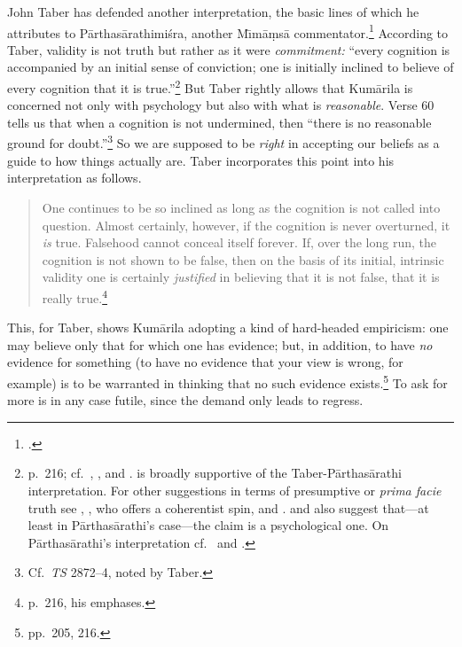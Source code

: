 \documentclass[11pt,letterpaper,oneside]{amsart}
\newenvironment{squote}{\begin{quote}\sf\small}{\rm\end{quote}} %
\begin{document}
John Taber has defended another interpretation, the basic lines of which he attributes to P\=arthas\=arathimi\'sra, another M\={\i}m\=a\d ms\=a commentator.\footnote{\citet{taber1992dkb}.} According to Taber, validity is not truth but rather as it were \emph{commitment:} ``every cognition is accompanied by an initial sense of conviction; one is initially inclined to believe of every cognition that it is true.''\footnote{p.\ 216; cf.\ \citet[p.\ 203]{taber1987review}, \citet[p.\ 172]{taber2002mo}, and \citet[p.\ 2]{taber2005hindu}. \cite{arnold2001ivr, arnold2001ivs} is broadly supportive of the Taber-P\=arthas\=arathi interpretation. For other suggestions in terms of presumptive or \emph{prima facie} truth see \citet[p.\ 18]{keith1921karma}, \citet[pp. 372--5]{dasgupta1957history}, who offers a coherentist spin, and \citet[pp.\ 131ff.]{bhatt1962epistemology}. \citet[p.\ 52]{chatterjea2003svatah} and \citet[p.\ 8]{mohanty1989gangesa} also suggest that---at least in P\=arthas\=arathi's case---the claim is a psychological one. On P\=arthas\=arathi's interpretation cf.\ \citet[pp.\ 50--5]{chatterjea2003svatah} and \citet[pp.\ 129--45]{bhatt1962epistemology}.} But Taber rightly allows that Kum\=arila is concerned not only with psychology but also with what is \emph{reasonable}. Verse 60 tells us that when a cognition is not undermined, then ``there is no reasonable ground for doubt.''\footnote{Cf.\ \emph{TS} 2872--4, noted by Taber.} So we are supposed to be \emph{right} in accepting our beliefs as a guide to how things actually are. Taber incorporates this point into his interpretation as follows. \begin{squote}One continues to be so inclined as long as the cognition is not called into question. Almost certainly, however, if the cognition is never overturned, it \emph{is} true. Falsehood cannot conceal itself forever. If, over the long run, the cognition is not shown to be false, then on the basis of its initial, intrinsic validity one is certainly \emph{justified} in believing that it is not false, that it is really true.\footnote{p.\ 216, his emphases.}\end{squote} This, for Taber, shows Kum\=arila adopting a kind of hard-headed empiricism: one may believe only that for which one has evidence; but, in addition, to have \emph{no} evidence for something (to have no evidence that your view is wrong, for example) is to be warranted in thinking that no such evidence exists.\footnote{pp.\ 205, 216.} To ask for more is in any case futile, since the demand only leads to regress.
\end{document}
